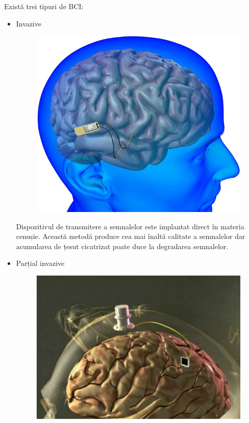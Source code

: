 Există trei tipuri de BCI:
\begin{itemize}
\item Invazive

\begin{figure}[h]
  \centering
  \includegraphics[scale=0.2]{img/invasiveBCI.jpg}
\end{figure}

Dispozitivul de transmitere a semnalelor este implantat direct în materia cenușie. Această metodă produce cea mai înaltă calitate a semnalelor dar acumularea de țesut cicatrizat poate duce la degradarea semnalelor.

\item Parțial invazive

\begin{figure}[h]
  \centering
  \includegraphics[scale=0.4]{img/BrainGate.jpg}
\end{figure}


\end{itemize}
